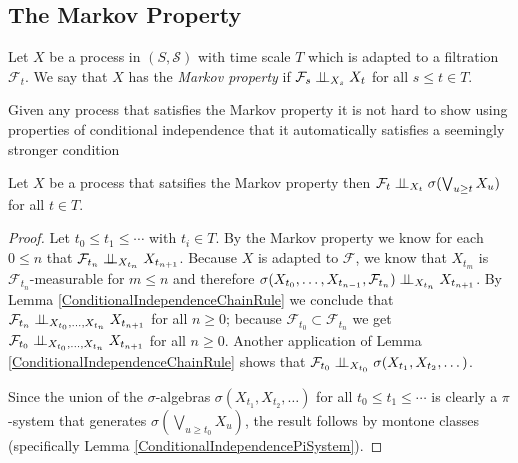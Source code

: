 \subsection{The Markov Property}
\begin{defn}Let $X$ be a process in $(S, \mathcal{S})$ with time scale
  $T$ which is adapted to a filtration $\mathcal{F}_t$.  We say that
  $X$ has the \emph{Markov property} if 
$\cindependent{\mathcal{F}_s}{X_t}{X_s}$ for all $s \leq t \in T$.
\end{defn}
Given any process that satisfies the Markov property it is not hard to
show using properties of conditional independence that it
automatically satisfies a seemingly stronger condition
\begin{lem}\label{ExtendedMarkovProperty}
Let $X$ be a process that satsifies the Markov property
  then $\cindependent{\mathcal{F}_t}{\sigma(\bigvee_{u \geq t}
    X_u)}{X_t}$ for all $t \in T$.
\end{lem}
\begin{proof}
Let $t_0 \leq t_1 \leq \cdots $ with $t_i \in T$.  By the
Markov property we know for each $0 \leq n$ that
$\cindependent{\mathcal{F}_{t_n}}{X_{t_{n+1}}}{X_{t_n}}$.  Because $X$ is
adapted to $\mathcal{F}$, we know that $X_{t_m}$ is
$\mathcal{F}_{t_n}$-measurable for $m \leq n$ and therefore
$\cindependent{\sigma(X_{t_0}, \dots
  ,X_{t_{n-1}},\mathcal{F}_{t_n})}{X_{t_{n+1}}}{X_{t_n}}$.
By Lemma \ref{ConditionalIndependenceChainRule} we conclude that $\cindependent{\mathcal{F}_{t_n}}{X_{t_{n+1}}}{X_{t_0}, \dots
  ,X_{t_n}}$ for all $n \geq 0$; because $\mathcal{F}_{t_0} \subset
\mathcal{F}_{t_n}$ we get $\cindependent{\mathcal{F}_{t_0}}{X_{t_{n+1}}}{X_{t_0}, \dots
  ,X_{t_n}}$ for all $n \geq 0$.  Another application of Lemma
\ref{ConditionalIndependenceChainRule} shows that
$\cindependent{\mathcal{F}_{t_0}}{\sigma(X_{t_1}, X_{t_2},
  \dots)}{X_{t_0}}$.

Since the union of the $\sigma$-algebras $\sigma(X_{t_1}, X_{t_2},
  \dots )$ for all $t_0 \leq t_1 \leq \cdots $ is
  clearly a $\pi$-system that generates $\sigma(\bigvee_{u \geq t_0}X_u)$, the result follows by montone classes (specifically Lemma \ref{ConditionalIndependencePiSystem}).
\end{proof}

